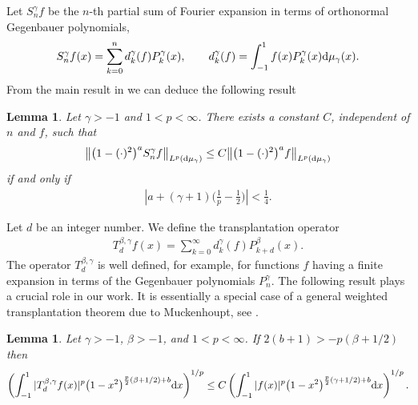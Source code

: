 \documentclass[pdftex]{sigma}
\newtheorem{lem}[thm]{Lemma}
\numberwithin{equation}{section}
\begin{document}
Let $S_n^{\gamma}f$ be the $n$-th partial sum of Fourier expansion in terms of orthonormal Gegenbauer polynomials,
\begin{gather*}
S_n^{\gamma}f(x)=\sum_{k=0}^n d_k^{\gamma}(f)P_k^{\gamma}(x),\qquad d_k^{\gamma}(f)=\int_{-1}^1 f(x)P_k^{\gamma}(x) {\rm d}\mu_{\gamma}(x).
\end{gather*}
From the main result in \cite{muckenhoupt1} we can deduce the following result
\begin{lem}\label{acotacion}
	Let $\gamma>-1$ and $1<p<\infty$. There exists a constant $C$, independent of $n$ and $f$, such that
	\begin{gather*}
	\big\|\big(1-(\cdot)^2\big)^a S^{\gamma}_nf\big\|_{L^p({\rm d}\mu_{\gamma})}\le C\big\|\big(1-(\cdot)^2\big)^a f\big\|_{L^p ({\rm d}\mu_{\gamma})}
	\end{gather*}
	if and only if
	\begin{gather*}%
	\left|a+(\gamma+1)\bigg(\frac{1}{p}-\frac{1}{2}\bigg)\right|<\frac{1}{4}.
	\end{gather*}
\end{lem}

Let $d$ be an integer number. We define the transplantation operator
\begin{gather*}
T_{d}^{\beta,\gamma}f(x)=\sum_{k=0}^{\infty}d_k^{\gamma}(f)P_{k+d}^{\beta}(x).
\end{gather*}
The operator $T_{d}^{\beta,\gamma}$ is well defined, for example, for functions $f$ having a finite expansion in terms of the Gegenbauer polynomials $P_n^\gamma$. The following result plays a crucial role in our work. It is essentially a special case of a general weighted transplantation theorem due to Muckenhoupt, see \cite[Theorem 1.6]{muckenhoupt}.

\begin{lem}\label{mukchenhoupt}
	Let $\gamma>-1$, $\beta>-1$, and $1<p<\infty$. If $2(b+1)>-p(\beta+1/2)$ then	
	\begin{gather*}%
	\left(\int_{-1}^{1}|T_{d}^{\beta,\gamma}f(x)|^p\big(1-x^2\big)^{\frac{p}{2}(\beta+1/2)+b} {\rm d}x\right)^{1/p} \le C\left(\int_{-1}^{1}|f(x)|^p\big(1-x^2\big)^{\frac{p}{2}(\gamma+1/2)+b} {\rm d}x\right)^{1/p}.
	\end{gather*}
\end{lem}
\end{document}

